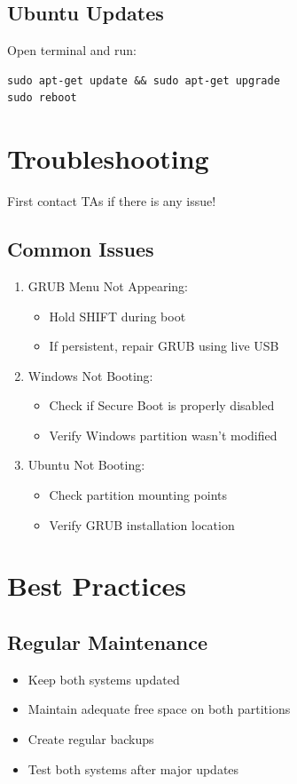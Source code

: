 \documentclass[11pt,a4paper]{article}
\begin{document}
\subsection{Ubuntu Updates}
Open terminal and run:
\begin{lstlisting}
sudo apt-get update && sudo apt-get upgrade
sudo reboot
\end{lstlisting}

\section{Troubleshooting}
First contact TAs if there is any issue!
\subsection{Common Issues}
\begin{enumerate}
    \item GRUB Menu Not Appearing:
    \begin{itemize}
        \item Hold SHIFT during boot
        \item If persistent, repair GRUB using live USB
    \end{itemize}
    
    \item Windows Not Booting:
    \begin{itemize}
        \item Check if Secure Boot is properly disabled
        \item Verify Windows partition wasn't modified
    \end{itemize}
    
    \item Ubuntu Not Booting:
    \begin{itemize}
        \item Check partition mounting points
        \item Verify GRUB installation location
    \end{itemize}
\end{enumerate}

\section{Best Practices}
\subsection{Regular Maintenance}
\begin{itemize}
    \item Keep both systems updated
    \item Maintain adequate free space on both partitions
    \item Create regular backups
    \item Test both systems after major updates
\end{itemize}
\end{document}
